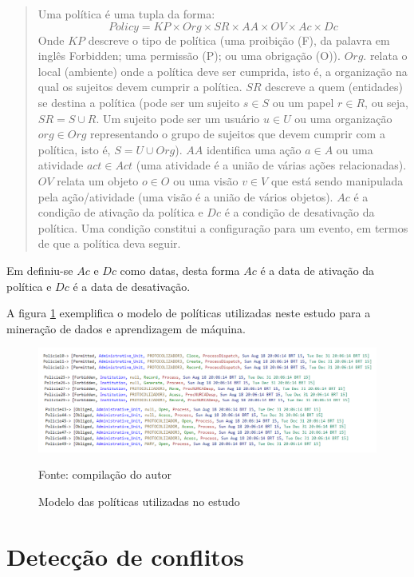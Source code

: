 \begin{quotation}
	Uma política é uma tupla da forma:
	\begin{equation}\label{key}
	Policy = KP \times Org \times SR \times AA \times OV \times Ac \times Dc
	\end{equation}
	Onde $ KP $ descreve o tipo de política (uma proibição (F), da palavra em inglês Forbidden; uma permissão (P); ou uma obrigação (O)). $ Org $. relata o local (ambiente) onde a política deve ser cumprida, isto é, a organização na qual os sujeitos devem cumprir a política. $ SR $ descreve a quem (entidades) se destina a política (pode ser um sujeito $ s \in S $ ou um papel $ r \in R $, ou seja, $ SR = S \cup R $. Um sujeito pode ser um usuário $ u \in U $ ou uma organização $ org \in Org $ representando o grupo de sujeitos que devem cumprir com a política, isto é, $ S = U \cup Org $). $ AA $ identifica uma ação $ a \in A  $ ou uma atividade $ act \in Act  $ (uma atividade é a união de várias ações relacionadas). $ OV $ relata um objeto $ o \in O $ ou uma visão $ v \in V $ que está sendo manipulada pela ação/atividade (uma visão é a união de vários objetos). $ Ac $ é a condição de ativação da política e $ Dc $ é a condição de desativação da política. Uma condição constitui a configuração para um evento, em termos de que a política deva seguir. 
\end{quotation}

Em \cite{sarkis2017} definiu-se $ Ac $ e $ Dc $ como datas, desta forma $ Ac $ é a data de ativação da política e $ Dc $ é a data de desativação.

A figura \ref{fig:modelo_politica} exemplifica o modelo de políticas utilizadas neste estudo para a mineração de dados e aprendizagem de máquina.

\begin{figure}[h!]
	\centering
	\includegraphics[width=.8\textwidth]{imagens/modelo_politica.png}
	\caption{Modelo das políticas utilizadas no estudo}
	{\scriptsize Fonte: compilação do autor}
	\label{fig:modelo_politica}
\end{figure}

\section{Detecção de conflitos} \label{deteccao_conflitos}

